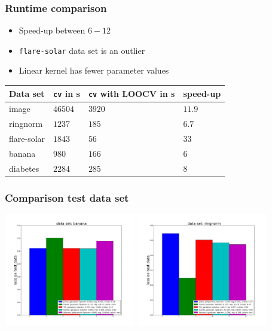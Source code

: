 \begin{frame}
	\frametitle{Runtime comparison}
	\begin{itemize}
		\item Speed-up between $6-12$
		\item \texttt{flare-solar} data set is an outlier
		\item Linear kernel has fewer parameter values
	\end{itemize}
	\begin{table}
		\centering
		\begin{tabular}{llll}
		Data set & \texttt{cv} in s & \texttt{cv} with LOOCV in s & speed-up\\
		\hline
		image & $46504$ & $3920$ & $11.9$\\
		ringnorm & $1237$ & $185$ & $6.7$\\
		flare-solar & $1843$ & $56$ & $33$ \\
		banana & $980$ & $166$ & $6$\\
		diabetes & $2284$ & $285$ & $8$
		\end{tabular}
	\end{table}	
\end{frame}

\begin{frame}
	\frametitle{Comparison test data set}
	\includegraphics[width=5.75cm]{images/ps3_results_banana.png}
	\includegraphics[width=5.75cm]{images/ps3_results_ringnorm.png}
\end{frame}

